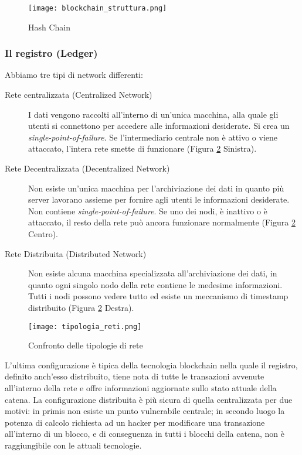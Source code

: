 \begin{figure}[htbp]
  \centering
  \texttt{[image: blockchain\_struttura.png]}
  \caption{Hash Chain}
  \label{fig:hash_chain}
\end{figure}

\subsubsection{Il registro (Ledger)}
Abbiamo tre tipi di network differenti:
\begin{description}
  \item[Rete centralizzata (Centralized Network)] I dati vengono raccolti all'interno di un'unica macchina, alla quale gli utenti si connettono per accedere alle informazioni desiderate. Si crea un \textit{single-point-of-failure}. Se l'intermediario centrale non è attivo o viene attaccato, l'intera rete smette di funzionare (Figura \ref{fig:tipologie_reti} Sinistra).
  \item[Rete Decentralizzata (Decentralized Network)] Non esiste un'unica macchina per l'archiviazione dei dati in quanto più server lavorano assieme per fornire agli utenti le informazioni desiderate. Non contiene \textit{single-point-of-failure}. Se uno dei nodi, è inattivo o è attaccato, il resto della rete può ancora funzionare normalmente (Figura \ref{fig:tipologie_reti} Centro).
  \item[Rete Distribuita (Distributed Network)] Non esiste alcuna macchina specializzata all'archiviazione dei dati, in quanto ogni singolo nodo della rete contiene le medesime informazioni. Tutti i nodi possono vedere tutto ed esiste un meccanismo di timestamp distribuito (Figura \ref{fig:tipologie_reti} Destra).
\end{description}

\begin{figure}[htbp]
  \centering
  \texttt{[image: tipologia\_reti.png]}
  \caption{Confronto delle tipologie di rete}
  \label{fig:tipologie_reti}
\end{figure}

L'ultima configurazione è tipica della tecnologia blockchain nella quale il registro, definito anch'esso distribuito, tiene nota di tutte le transazioni avvenute all'interno della rete e offre informazioni aggiornate sullo stato attuale della catena. La configurazione distribuita è più sicura di quella centralizzata per due motivi: in primis non esiste un punto vulnerabile centrale; in secondo luogo la potenza di calcolo richiesta ad un hacker per modificare una transazione all'interno di un blocco, e di conseguenza in tutti i blocchi della catena, non è raggiungibile con le attuali tecnologie.


